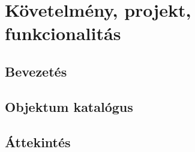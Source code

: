 %
\chapter{Követelmény, projekt, funkcionalitás}

\thispagestyle{fancy}

\section{Bevezetés}


\section{Objektum katalógus}









\section{Áttekintés}



